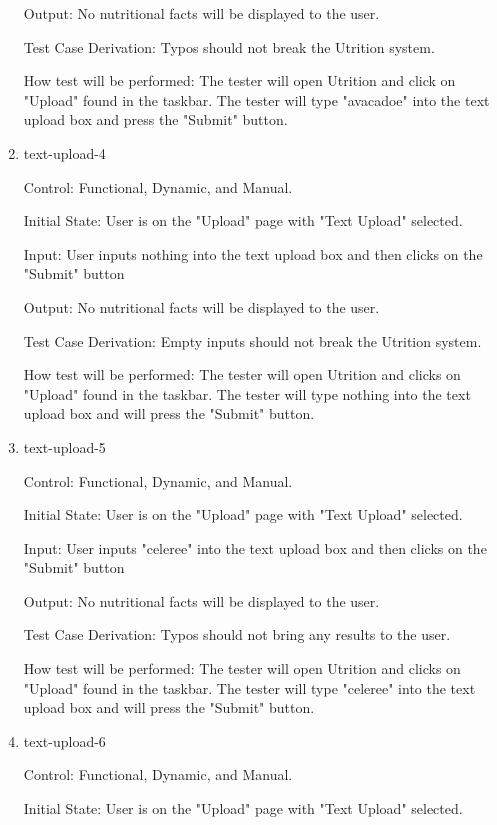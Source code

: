 \documentclass[12pt, titlepage]{article}
\begin{document}
\begin{enumerate}
	Output: No nutritional facts will be displayed to the user.
	
	Test Case Derivation: Typos should not break the Utrition system.
	
	How test will be performed: The tester will open Utrition and click on "Upload" found in the taskbar. The tester will type "avacadoe" into the text upload box and press the "Submit" button.
	
	\item{text-upload-4\\}
	
	Control: Functional, Dynamic, and Manual.
	
	Initial State: User is on the "Upload" page with "Text Upload" selected.
	
	Input: User inputs nothing into the text upload box and then clicks on the "Submit" button
	
	Output: No nutritional facts will be displayed to the user.
	
	Test Case Derivation: Empty inputs should not break the Utrition system.
	
	How test will be performed: The tester will open Utrition and clicks on "Upload" found in the taskbar. The tester will type nothing into the text upload box and will press the "Submit" button.
	
	\item{text-upload-5\\}
	
	Control: Functional, Dynamic, and Manual.
	
	Initial State: User is on the "Upload" page with "Text Upload" selected.
	
	Input: User inputs "celeree" into the text upload box and then clicks on the "Submit" button
	
	Output: No nutritional facts will be displayed to the user.
	
	Test Case Derivation: Typos should not bring any results to the user.
	
	How test will be performed: The tester will open Utrition and clicks on "Upload" found in the taskbar. The tester will type "celeree" into the text upload box and will press the "Submit" button.
	
	\item{text-upload-6\\}
	
	Control: Functional, Dynamic, and Manual.
	
	Initial State: User is on the "Upload" page with "Text Upload" selected.
	

\end{enumerate}
\end{document}
